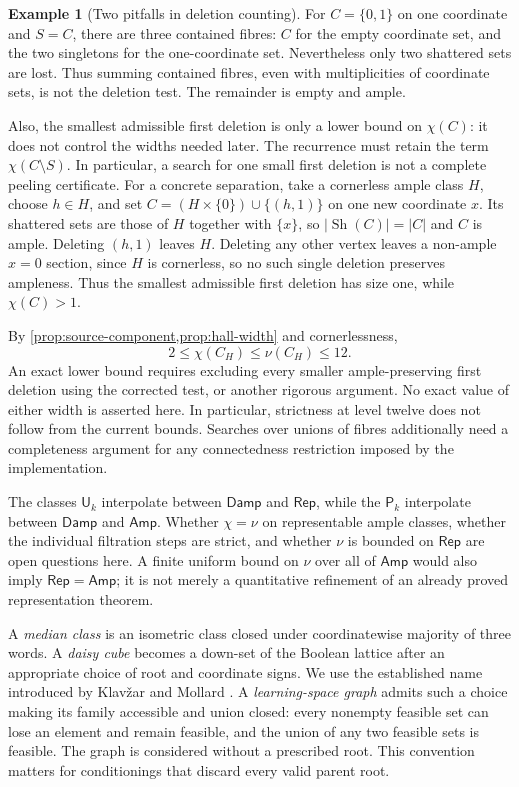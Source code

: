 \documentclass[11pt]{article}
\theoremstyle{definition}
\newtheorem{example}[proposition]{Example}
\newcommand{\Amp}{\mathsf{Amp}}
\newcommand{\Damp}{\mathsf{Damp}}
\newcommand{\Rep}{\mathsf{Rep}}
\newcommand{\Sh}{\operatorname{Sh}}
\begin{document}
\begin{example}[Two pitfalls in deletion counting]\label{ex:width-counting-pitfalls}
For $C=\{0,1\}$ on one coordinate and $S=C$, there are three contained
fibres: $C$ for the empty coordinate set, and the two singletons for the
one-coordinate set. Nevertheless only two shattered sets are lost.
Thus summing contained fibres, even with multiplicities of coordinate sets,
is not the deletion test. The remainder is empty and ample.

Also, the smallest admissible first deletion is only a lower bound on
$\chi(C)$: it does not control the widths needed later. The recurrence
must retain the term $\chi(C\setminus S)$. In particular, a search for
one small first deletion is not a complete peeling certificate.
For a concrete separation, take a cornerless ample class $H$, choose
$h\in H$, and set
$C=(H\times\{0\})\cup\{(h,1)\}$ on one new coordinate $x$.
Its shattered sets are those of $H$ together with $\{x\}$, so
$|\Sh(C)|=|C|$ and $C$ is ample. Deleting $(h,1)$ leaves $H$.
Deleting any other vertex leaves a non-ample $x=0$ section, since $H$ is
cornerless, so no such single deletion preserves ampleness. Thus the
smallest admissible first deletion has size one, while $\chi(C)>1$.
\end{example}

By \cref{prop:source-component,prop:hall-width} and cornerlessness,
\[
 2\le\chi(C_H)\le\nu(C_H)\le12.
\]
An exact lower bound requires excluding every smaller ample-preserving
first deletion using the corrected test, or another rigorous argument.
No exact value of either width is asserted here. In particular, strictness
at level twelve does not follow from the current bounds. Searches over
unions of fibres additionally need a completeness argument for any
connectedness restriction imposed by the implementation.

The classes $\mathsf U_k$ interpolate between $\Damp$ and $\Rep$,
while the $\mathsf P_k$ interpolate between $\Damp$ and $\Amp$.
Whether $\chi=\nu$ on representable ample classes, whether the individual
filtration steps are strict, and whether $\nu$ is bounded on $\Rep$ are
open questions here. A finite uniform bound on $\nu$ over all of $\Amp$
would also imply $\Rep=\Amp$; it is not merely a quantitative refinement
of an already proved representation theorem.

A \emph{median class} is an isometric class closed under coordinatewise
majority of three words. A \emph{daisy cube} becomes a down-set of the
Boolean lattice after an appropriate choice of root and coordinate signs.
We use the established name introduced by Klav\v{z}ar and Mollard
\cite{KlavzarMollardDaisy}.
A \emph{learning-space graph} admits such a choice making its family
accessible and union closed: every nonempty feasible set can lose an element
and remain feasible, and the union of any two feasible sets is feasible.
The graph is considered without a prescribed root. This convention matters
for conditionings that discard every valid parent root.
\end{document}
